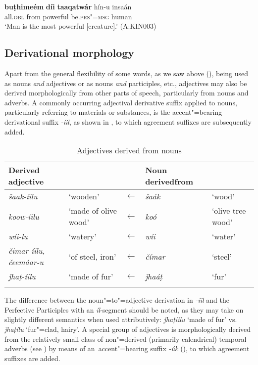 \begin{exe}
\ex
\label{ex:6-9}
\gll \textbf{buṭhimeém} \textbf{díi} \textbf{taaqatwár} hín-u insaán \\
all.\textsc{obl} from powerful be.\textsc{prs"=msg} human \\
\glt `Man is the most powerful [creature].' (A:KIN003)
\end{exe}

\subsection{Derivational morphology}
\label{subsec:6-3-4}

Apart from the general flexibility of some words, as we saw above (), being used as nouns \textit{and} adjectives or as nouns \textit{and} participles, etc., adjectives may also be derived morphologically from other parts of speech, particularly from nouns and adverbs. A commonly occurring adjectival derivative suffix applied to nouns, particularly referring to materials or substances, is the accent"=bearing derivational suffix \textit{-íil}, as shown in , to which agreement suffixes are subsequently added.


\begin{table}[ht]
\caption{Adjectives derived from nouns}
\begin{tabularx}{\textwidth}{ Q l l P{22mm} l }
\lsptoprule
Derived adjective &
&
&
Noun derived\newline from &
\\\hline
\textit{šaak-íilu} &
`wooden' &
$\leftarrow$ &
\textit{šaák} &
`wood'\\
\textit{koow-íilu} &
`made of olive wood' &
$\leftarrow$ &
\textit{koó} &
`olive tree wood'\\
\textit{wíi-lu} &
`watery' &
$\leftarrow$ &
\textit{wíi} &
`water'\\
\textit{čimar-íilu, čeemáar-u} &
`of steel, iron' &
$\leftarrow$ &
\textit{čímar} &
`steel'\\
\textit{ǰhaṭ-íilu} &
`made of fur' &
$\leftarrow$ &
\textit{ǰhaáṭ} &
`fur'\\\lspbottomrule
\end{tabularx}
\label{tab:6-5}
\end{table}


The difference between the noun"=to"=adjective derivation in \textit{-íil} and the Perfective Participles with an \textit{íl}-segment should be noted, as they may take on slightly different semantics when used attributively: \textit{ǰhaṭíilu} `made of fur' vs. \textit{ǰhaṭílu} `fur"=clad, hairy'. A special group of adjectives is morphologically derived from the relatively small class of non"=derived (primarily calendrical) temporal adverbs (see ) by means of an~accent"=bearing suffix \textit{-úk} (), to which agreement suffixes are added.


